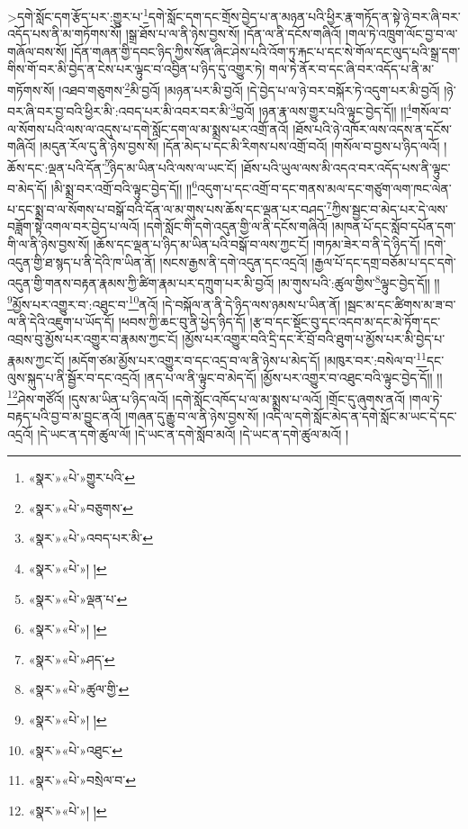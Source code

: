>དགེ་སློང་དག་རྩོད་པར་:གྱུར་པ་\footnote{«སྣར་»«པེ་»གྱུར་པའི་}དགེ་སློང་དག་དང་གྲོས་བྱེད་པ་ན་མཉན་པའི་ཕྱིར་རྣ་གཏོད་ན་སྟེ་ཉེ་བར་ཞི་བར་འདོད་པས་ནི་མ་གཏོགས་སོ། །སྒྲ་ཐོས་པ་ལ་ནི་ཉེས་བྱས་སོ། །དོན་ལ་ནི་དངོས་གཞིའོ། །གལ་ཏེ་འཁྲུག་ལོང་བྱ་བ་ལ་གཞོལ་བས་སོ། །དོན་གཞན་གྱི་དབང་ཉིད་ཀྱིས་སོན་ཞིང་ཤེས་པའི་འོག་ཏུ་རྐང་པ་དང་སེ་གོལ་དང་ལུད་པའི་སྒྲ་དག་གིས་གོ་བར་མི་བྱེད་ན་ངེས་པར་ལྟུང་བ་འབྱིན་པ་ཉིད་དུ་འགྱུར་ཏེ། གལ་ཏེ་ནོར་བ་དང་ཞི་བར་འདོད་པ་ནི་མ་གཏོགས་སོ། །འཐབ་གཅུགས་\footnote{«སྣར་»«པེ་»བཅུགས་}མི་བྱའོ། །མཉན་པར་མི་བྱའོ། །དེ་བྱེད་པ་ལ་ཉེ་བར་བསྐོར་ཏེ་འདུག་པར་མི་བྱའོ། །ཉེ་བར་ཞི་བར་བྱ་བའི་ཕྱིར་མི་:འབད་པར་མི་འབར་བར་མི་\footnote{«སྣར་»«པེ་»འབད་པར་མི་}བྱའོ། །ཉན་རྣ་ལས་གྱུར་པའི་ལྟུང་བྱེད་དོ།། །།\footnote{«སྣར་»«པེ་»། །}གསོལ་བ་ལ་སོགས་པའི་ལས་ལ་འདུས་པ་དགེ་སློང་དག་ལ་མ་སྨྲས་པར་འགྲོ་ནའོ། །ཐོས་པའི་ཉེ་འཁོར་ལས་འདས་ན་དངོས་གཞིའོ། །མདུན་རོལ་དུ་ནི་ཉེས་བྱས་སོ། །དོན་མེད་པ་དང་མི་རིགས་པས་འགྲོ་བའོ། །གསོལ་བ་བྱས་པ་ཉིད་ལའོ། །ཆོས་དང་:ལྡན་པའི་དོན་\footnote{«སྣར་»«པེ་»ལྡན་པ་}ཉིད་མ་ཡིན་པའི་ལས་ལ་ཡང་ངོ། །ཐོས་པའི་ཡུལ་ལས་མི་འདའ་བར་འདོད་པས་ནི་ལྟུང་བ་མེད་དོ། །མི་སྨྲ་བར་འགྲོ་བའི་ལྟུང་བྱེད་དོ།། །།\footnote{«སྣར་»«པེ་»། །}འདུག་པ་དང་འགྲོ་བ་དང་གནས་མལ་དང་གཙུག་ལག་ཁང་ལེན་པ་དང་སྨྲ་བ་ལ་སོགས་པ་བསྒོ་བའི་དོན་ལ་མ་གུས་པས་ཆོས་དང་ལྡན་པར་བཤད་\footnote{«སྣར་»«པེ་»ཤད་}ཀྱིས་སྦྱང་བ་མེད་པར་དེ་ལས་བཟློག་སྟེ་འགལ་བར་བྱེད་པ་ལའོ། །དགེ་སློང་གི་དགེ་འདུན་གྱི་ལ་ནི་དངོས་གཞིའོ། །མཁན་པོ་དང་སློབ་དཔོན་དག་གི་ལ་ནི་ཉེས་བྱས་སོ། །ཆོས་དང་ལྡན་པ་ཉིད་མ་ཡིན་པའི་བསྒོ་བ་ལས་ཀྱང་ངོ། །གཏམ་ཟེར་བ་ནི་དེ་ཉིད་དོ། །དགེ་འདུན་གྱི་ཐ་སྙད་པ་ནི་དེའི་ཁ་ཡིན་ནོ། །སངས་རྒྱས་ནི་དགེ་འདུན་དང་འདྲའོ། །རྒྱལ་པོ་དང་དགྲ་བཅོམ་པ་དང་དགེ་འདུན་གྱི་གནས་བརྟན་རྣམས་ཀྱི་ཚིག་རྣམ་པར་དཀྲུག་པར་མི་བྱའོ། །མ་གུས་པའི་:ཚུལ་གྱིས་\footnote{«སྣར་»«པེ་»ཚུལ་གྱི་}ལྟུང་བྱེད་དོ།། །།\footnote{«སྣར་»«པེ་»། །}མྱོས་པར་འགྱུར་བ་:འཐུང་བ་\footnote{«སྣར་»«པེ་»འཐུང་}ནའོ། །དེ་བསྐོལ་ན་ནི་དེ་ཉིད་ལས་ཉམས་པ་ཡིན་ནོ། །སྦང་མ་དང་ཚིགས་མ་ཟ་བ་ལ་ནི་དེའི་འཇུག་པ་ཡོད་དོ། །ཕབས་ཀྱི་ཆང་བུ་ནི་ཕྱེད་ཉིད་དོ། །རྩ་བ་དང་སྡོང་བུ་དང་འདབ་མ་དང་མེ་ཏོག་དང་འབྲས་བུ་མྱོས་པར་འགྱུར་བ་རྣམས་ཀྱང་ངོ། །མྱོས་པར་འགྱུར་བའི་དྲི་དང་རོ་བྲོ་བའི་ཐུག་པ་མྱོས་པར་མི་བྱེད་པ་རྣམས་ཀྱང་ངོ། །མདོག་ཙམ་མྱོས་པར་འགྱུར་བ་དང་འདྲ་བ་ལ་ནི་ཉེས་པ་མེད་དོ། །མཁུར་བར་:བསེལ་བ་\footnote{«སྣར་»«པེ་»བསྲེལ་བ་}དང་ལུས་སྐུད་པ་ནི་སྦྱོར་བ་དང་འདྲའོ། །ནད་པ་ལ་ནི་ལྟུང་བ་མེད་དོ། །མྱོས་པར་འགྱུར་བ་འཐུང་བའི་ལྟུང་བྱེད་དོ།། །།\footnote{«སྣར་»«པེ་»། །}ཤེས་གཙོའོ། །དུས་མ་ཡིན་པ་ཉིད་ལའོ། །དགེ་སློང་འཁོད་པ་ལ་མ་སྨྲས་པ་ལའོ། །གྲོང་དུ་ཞུགས་ནའོ། །གལ་ཏེ་བརྟད་པའི་བྱ་བ་མ་བྱུང་ནའོ། །གཞན་དུ་རྒྱུ་བ་ལ་ནི་ཉེས་བྱས་སོ། །འདི་ལ་དགེ་སློང་མེད་ན་དགེ་སློང་མ་ཡང་དེ་དང་འདྲའོ། །དེ་ཡང་ན་དགེ་ཚུལ་ལོ། །དེ་ཡང་ན་དགེ་སློབ་མའོ། །དེ་ཡང་ན་དགེ་ཚུལ་མའོ། །

